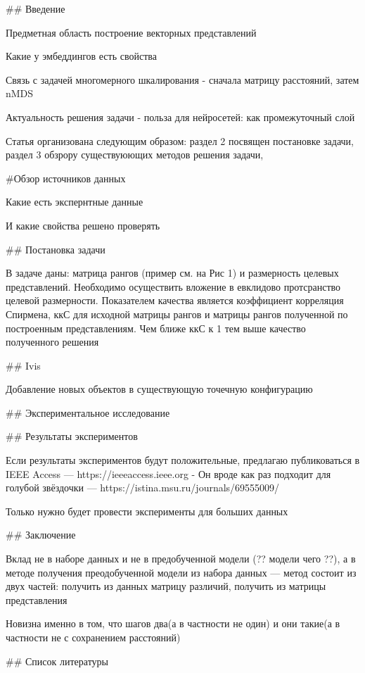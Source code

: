 
## Введение

Предметная область построение векторных представлений

Какие у эмбеддингов есть свойства

Связь с задачей многомерного шкалирования - сначала матрицу расстояний, затем nMDS

Актуальность решения задачи - польза для нейросетей: как промежуточный слой

Статья организована следующим образом: раздел 2 посвящен постановке задачи, раздел 3 обзрору существуюющих методов решения задачи, 

#Обзор источников данных

Какие есть экспернтные данные

И какие свойства решено проверять


## Постановка задачи

В задаче даны: матрица рангов (пример см. на Рис 1) и размерность целевых представлений. Необходимо осуществить вложение в евклидово протсранство целевой размерности. Показателем качества является коэффициент корреляция Спирмена, ккС для исходной матрицы рангов и матрицы рангов полученной по построенным представлениям. Чем ближе ккС к 1 тем выше качество полученного решения

## Ivis 

Добавление новых объектов в существующую точечную конфигурацию



## Экспериментальное исследование



## Результаты экспериментов

Если результаты экспериментов будут положительные, предлагаю публиковаться в IEEE Access — https://ieeeaccess.ieee.org - Он вроде как раз подходит для голубой звёздочки — https://istina.msu.ru/journals/69555009/

Только нужно будет провести эксперименты для больших данных


## Заключение

Вклад не в наборе данных и не в предобученной модели (?? модели чего ??), а в методе получения преодобученной модели из набора данных — метод состоит из двух частей: получить из данных матрицу различий, получить из матрицы представления
 
Новизна именно в том, что шагов два(а в частности не один) и они такие(а в частности не с сохранением расстояний)

## Список литературы
